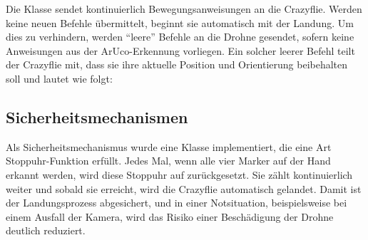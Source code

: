 Die Klasse  sendet kontinuierlich Bewegungsanweisungen an die Crazyflie.
Werden keine neuen Befehle übermittelt, beginnt sie automatisch mit der Landung.
Um dies zu verhindern, werden \enquote{leere} Befehle an die Drohne gesendet, sofern keine Anweisungen aus der ArUco-Erkennung vorliegen.
Ein solcher leerer Befehl teilt der Crazyflie mit, dass sie ihre aktuelle Position und Orientierung beibehalten soll und lautet wie folgt:
\begin{center}
\end{center}

\subsection{Sicherheitsmechanismen}
Als Sicherheitsmechanismus wurde eine Klasse implementiert, die eine Art Stoppuhr-Funktion erfüllt.
Jedes Mal, wenn alle vier Marker auf der Hand erkannt werden, wird diese Stoppuhr auf  zurückgesetzt.
Sie zählt kontinuierlich weiter und sobald sie  erreicht, wird die Crazyflie automatisch gelandet.
Damit ist der Landungsprozess abgesichert, und in einer Notsituation, beispielsweise bei einem Ausfall der Kamera, wird das Risiko einer Beschädigung der Drohne deutlich reduziert.


\endgroup
